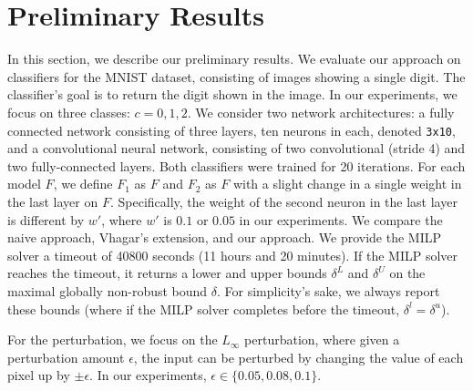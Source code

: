 
\section{Preliminary Results}
In this section, we describe our preliminary results.
We evaluate our approach on classifiers for the MNIST dataset, consisting of images showing a single digit.
The classifier's goal is to return the digit shown in the image. In our experiments, we focus on three classes: $c=0,1,2$.
We consider two network architectures: 
a fully connected network consisting of three layers, ten neurons in each, denoted \texttt{3x10}, and a convolutional neural network, 
consisting of two convolutional (stride 4) and two fully-connected layers. Both classifiers were trained for 20 iterations.
For each model $F$, we define $F_1$ as $F$ and $F_2$ as $F$ with a slight change in a single weight in the last layer on $F$. Specifically, the weight of the second neuron in the last layer is different by $w'$, where $w'$ is $0.1$ or $0.05$ in our experiments.
We compare the naive approach, Vhagar's extension, and our approach.
We provide the MILP solver a timeout of 40800 seconds (11 hours and 20 minutes).
If the MILP solver reaches the timeout, it returns a lower and upper bounds $\delta^L$ and $\delta^U$ on the maximal globally non-robust bound $\delta$. For simplicity's sake, we always report these bounds (where if the MILP solver completes before the timeout, $\delta^l=\delta^u$).
\begin{comment}
\begin{table}[H]
    \centering
    \resizebox{\textwidth}{!}{
    \begin{tabular}{@{\extracolsep{\fill}}llll@{}}
        \toprule
        \makecell{Dataset} & \makecell{Name} & \makecell{Architecture}  & \makecell{Iterations during training} \\
        \midrule            
        \multirow{2}{*}{MNIST} & 3 x 10 & 3 fully-connected layers & 20 \\
                               & CNN & 2 convolutional (stride 4) and 2 fully-connected layers & 20 \\
        \bottomrule
    \end{tabular}
    }
    \caption{The networks used for this experience.
        \label{table_architectures}}
\end{table}
\end{comment}
For the perturbation, we focus on the $L_\infty$ perturbation, where given a perturbation amount $\epsilon$, the input can be perturbed by changing the value of each pixel up by $\pm\epsilon$. In our experiments, $\epsilon\in\{0.05,0.08,0.1\}$.


